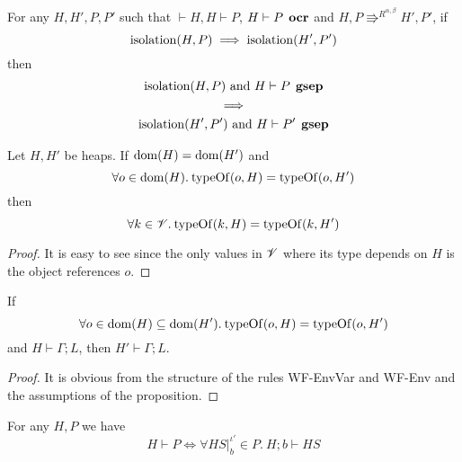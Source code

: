 \begin{corollary} \label{cor:2.9}
  For any $H, H', P, P'$ such that $\vdash H, H \vdash P$, $H \vdash P \:\:
  \mbox{\bf ocr}$ and $H, P \Rrightarrow^{R^{\alpha, \beta}} H', P'$, if
  \begin{equation*}
      \mbox{$\mathrm{isolation}$}(H, P) 
      \implies 
      \mbox{$\mathrm{isolation}$}(H', P')
  \end{equation*}
  then
  \begin{equation*}
    \begin{gathered}
      \mbox{$\mathrm{isolation}$}(H, P) \text{ and } H \vdash P \:\: \mbox{\bf gsep} \\
      \implies \\
      \mbox{$\mathrm{isolation}$}(H', P') \text{ and } H \vdash P' \:\: \mbox{\bf gsep}
    \end{gathered}
  \end{equation*}
\end{corollary}

\begin{proposition} \label{prop:2.12}
  Let $H, H'$ be heaps. If $\mbox{$\mathrm{dom}$}{(H)} = \mbox{$\mathrm{dom}$}{(H')}$ and
  \begin{equation*}
    \forall o \in \mbox{$\mathrm{dom}$}{(H)}. \: \mbox{$\mathrm{typeOf}$}{(o, H)} = \mbox{$\mathrm{typeOf}$}{(o, H')}
  \end{equation*}
  then 
  \begin{equation*}
    \forall k \in \mathscr{V}. \: \mbox{$\mathrm{typeOf}$}{(k, H)} = \mbox{$\mathrm{typeOf}$}{(k, H')}
  \end{equation*}
\end{proposition}

\begin{proof}
  It is easy to see since the only values in $\mathscr{V}$ where its type depends on
  $H$ is the object references $o$.
\end{proof}

\begin{proposition} \label{prop:2.19}
  If
  \begin{equation*}
    \forall o \in \mbox{$\mathrm{dom}$}(H) \subseteq \mbox{$\mathrm{dom}$}(H'). \: \mbox{$\mathrm{typeOf}$}(o, H) = \mbox{$\mathrm{typeOf}$}(o, H')
  \end{equation*}
  and $H \vdash \Gamma; L$, then $H' \vdash \Gamma; L$.
\end{proposition}

\begin{proof}
  It is obvious from the structure of the rules {\sc WF-EnvVar} and {\sc
  WF-Env} and the assumptions of the proposition.
\end{proof}

\begin{proposition} \label{prop:2.13}
  For any $H, P$ we have 
  \begin{equation}
    H \vdash P \iff \forall HS|_b^{\iota'} \in P.\: H;b \vdash HS
  \end{equation}
\end{proposition}

